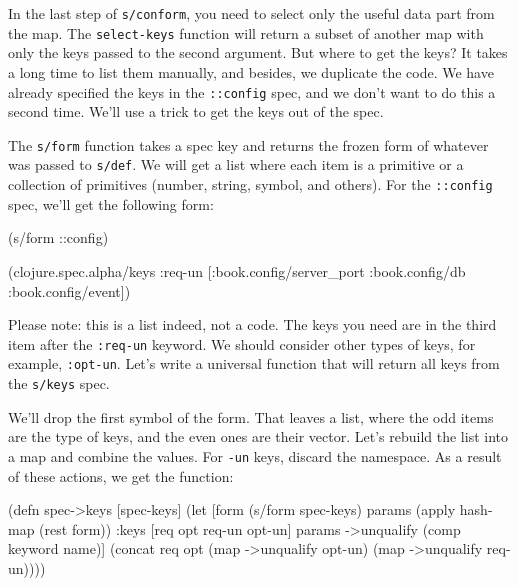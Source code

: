 
In the last step of \verb|s/conform|, you need to select only the useful data part from the map. The \verb|select-keys| function will return a subset of another map with only the keys passed to the second argument. But where to get the keys? It takes a long time to list them manually, and besides, we duplicate the code. We have already specified the keys in the \verb|::config| spec, and we don't want to do this a second time. We'll use a trick to get the keys out of the spec.

The \verb|s/form| function takes a spec key and returns the frozen form of whatever was passed to \verb|s/def|. We will get a list where each item is a primitive or a collection of primitives (number, string, symbol, and others). For the \verb|::config| spec, we'll get the following form:

\begin{clojure}
(s/form ::config)

(clojure.spec.alpha/keys
 :req-un [:book.config/server_port
          :book.config/db
          :book.config/event])
\end{clojure}


Please note: this is a list indeed, not a code. The keys you need are in the third item after the \verb|:req-un| keyword. We should consider other types of keys, for example, \verb|:opt-un|. Let's write a universal function that will return all keys from the \verb|s/keys| spec.

We'll drop the first symbol of the form. That leaves a list, where the odd items are the type of keys, and the even ones are their vector. Let's rebuild the list into a map and combine the values. For \verb|-un| keys, discard the namespace. As a result of these actions, we get the function:


\ifnarrow

\begin{clojure}
(defn spec->keys
  [spec-keys]
  (let [form (s/form spec-keys)
        params (apply hash-map
                 (rest form))
        {:keys [req opt req-un opt-un]}
        params
        ->unqualify (comp keyword name)]
    (concat req
            opt
            (map ->unqualify opt-un)
            (map ->unqualify req-un))))
\end{clojure}

\else

